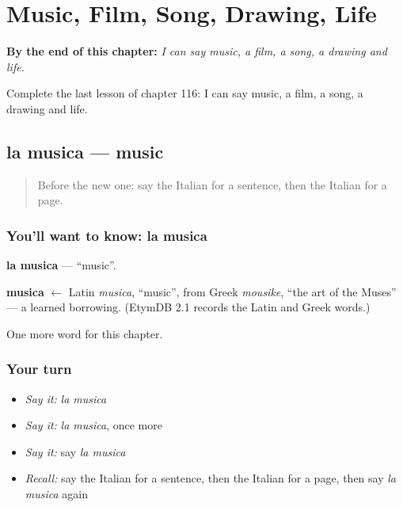 
\chapter{Music, Film, Song, Drawing, Life}
\label{ch:it-music-film-song-drawing-life}

\begin{chapteropening}
\textbf{By the end of this chapter:} \emph{I can say music, a film, a song, a drawing and life.}

Complete the last lesson of chapter 116: I can say music, a film, a song, a drawing and life.
\end{chapteropening}

\section[la musica]{la musica — music}

\label{lesson:IT-C116-musica}



\begin{quote}
Before the new one: say the Italian for a sentence, then the Italian for a page.
\end{quote}

\subsection*{You'll want to know: la musica}
\textbf{la musica} — \textquotedblleft{}music\textquotedblright{}.

\begin{cousinweb}
\textbf{musica} $\leftarrow$ Latin \emph{musica}, \textquotedblleft{}music\textquotedblright{}, from Greek \emph{mousike}, \textquotedblleft{}the art of the Muses\textquotedblright{} — a learned borrowing. (EtymDB 2.1 records the Latin and Greek words.)
\end{cousinweb}

\begin{grammarlens}[title={What you've built}]
One more word for this chapter.
\end{grammarlens}

\subsection*{Your turn}
\begin{itemize}
\raggedright
  \item \emph{Say it:} \emph{la musica}
  \item \emph{Say it:} \emph{la musica}, once more
  \item \emph{Say it:} say \emph{la musica}
  \item \emph{Recall:} say the Italian for a sentence, then the Italian for a page, then say \emph{la musica} again
\end{itemize}

